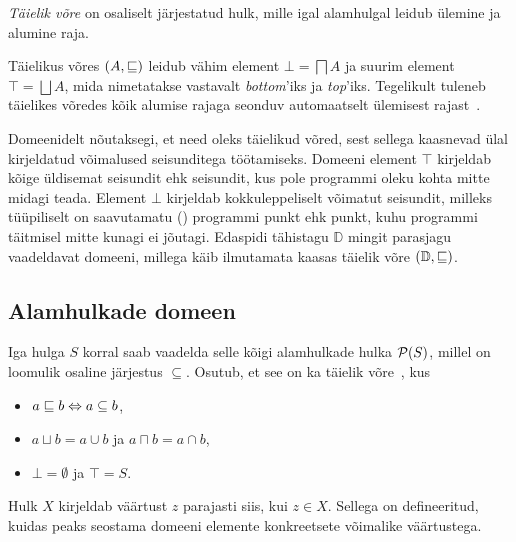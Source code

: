 \documentclass[../thesis.tex]{subfiles}
\begin{document}
\begin{definition}
\emph{Täielik võre} on osaliselt järjestatud hulk, mille igal alamhulgal leidub ülemine ja alumine raja.
\end{definition}

Täielikus võres $(A, \sqsubseteq)$ leidub vähim element $\bot = \bigsqcap A$ ja suurim element $\top = \bigsqcup A$, mida nimetatakse vastavalt \textit{bottom}'iks ja \textit{top}'iks. Tegelikult tuleneb täielikes võredes kõik alumise rajaga seonduv automaatselt ülemisest rajast~\cite[18]{seidl_foundations}.

Domeenidelt nõutaksegi, et need oleks täielikud võred, sest sellega kaasnevad ülal kirjeldatud võimalused seisunditega töötamiseks. Domeeni element $\top$ kirjeldab kõige üldisemat seisundit ehk seisundit, kus pole programmi oleku kohta mitte midagi teada. Element $\bot$ kirjeldab kokkuleppeliselt võimatut seisundit, milleks tüüpiliselt on saavutamatu () programmi punkt ehk punkt, kuhu programmi täitmisel mitte kunagi ei jõutagi. Edaspidi tähistagu $\mathbb{D}$ mingit parasjagu vaadeldavat domeeni, millega käib ilmutamata kaasas täielik võre $(\mathbb{D}, \sqsubseteq)$.


\subsection{Alamhulkade domeen}
Iga hulga $S$ korral saab vaadelda selle kõigi alamhulkade hulka $\mathcal{P}(S)$, millel on loomulik osaline järjestus $\subseteq$.
Osutub, et see on ka täielik võre~\cite[6]{laan_voreteooria}, kus
\begin{itemize}[nosep]
	\item $a \sqsubseteq b \Leftrightarrow a \subseteq b$,
	\item $a \sqcup b = a \cup b$ ja $a \sqcap b = a \cap b$,
	\item $\bot = \emptyset$ ja $\top = S$.
\end{itemize}

Hulk $X$ kirjeldab väärtust $z$ parajasti siis, kui $z \in X$. Sellega on defineeritud, kuidas peaks seostama domeeni elemente konkreetsete võimalike väärtustega.
\end{document}
